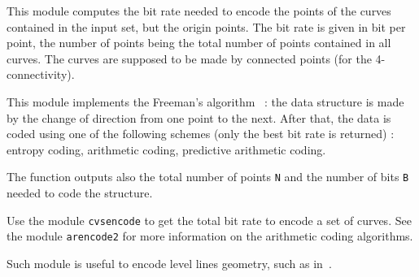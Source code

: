 This module computes the bit rate needed to encode
the points of the curves contained in the input set, but
the origin points.
The bit rate is given in bit per point, the number of points being
the total number of points contained in all curves.
The curves are supposed to be made by connected points 
(for the 4-connectivity).

This module implements the Freeman's 
algorithm~\cite{freeman:computer} : 
the data structure is made by the change of direction from one point to the next.
After that, the data is coded using one of the following schemes
(only the best bit rate is returned) :
entropy coding, arithmetic coding, predictive arithmetic coding.

The function outputs also the total number of points \verb+N+
and the number of bits \verb+B+ needed to code the structure.

Use the module \verb+cvsencode+ to get the total bit rate to encode
a set of curves.
See the module \verb+arencode2+ for more information on the arithmetic
coding algorithms.

Such module is useful to encode level lines geometry, such as 
in~\cite{froment:functional}.
